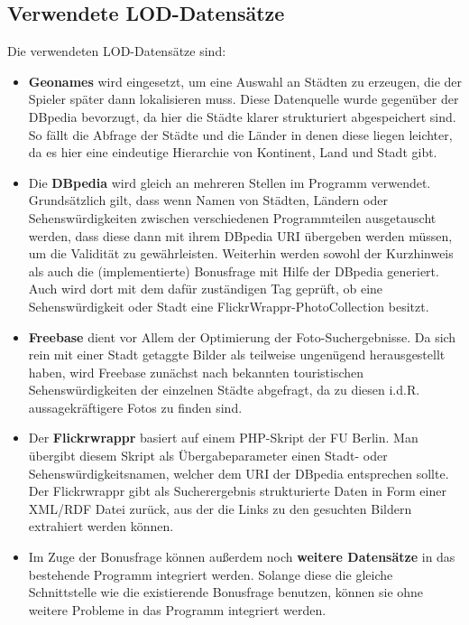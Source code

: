 \documentclass[a4paper, 11pt]{article}
\begin{document}
\subsection{Verwendete LOD-Datensätze}
Die verwendeten LOD-Datensätze sind:
\begin{itemize}
\item \textbf{Geonames} wird eingesetzt, um eine Auswahl an Städten zu erzeugen, die der Spieler später dann lokalisieren muss. Diese Datenquelle wurde gegenüber der DBpedia bevorzugt, da hier die Städte klarer strukturiert abgespeichert sind. So fällt die Abfrage der Städte und die Länder in denen diese liegen leichter, da es hier eine eindeutige Hierarchie von Kontinent, Land und Stadt gibt. 
\item Die \textbf{DBpedia} wird gleich an mehreren Stellen im Programm verwendet. Grundsätzlich gilt, dass wenn Namen von Städten, Ländern oder Sehenswürdigkeiten zwischen verschiedenen Programmteilen ausgetauscht werden, dass diese dann mit ihrem DBpedia URI übergeben werden müssen, um die Validität zu gewährleisten. Weiterhin werden sowohl der Kurzhinweis als auch die (implementierte) Bonusfrage mit Hilfe der DBpedia generiert. Auch wird dort mit dem dafür zuständigen Tag geprüft, ob eine Sehenswürdigkeit oder Stadt eine FlickrWrappr-PhotoCollection besitzt.
\item \textbf{Freebase} dient vor Allem der Optimierung der Foto-Suchergebnisse. Da sich rein mit einer Stadt getaggte Bilder als teilweise ungenügend herausgestellt haben, wird Freebase zunächst nach bekannten touristischen Sehenswürdigkeiten der einzelnen Städte abgefragt, da zu diesen i.d.R. aussagekräftigere Fotos zu finden sind.
\item Der \textbf{Flickrwrappr} basiert auf einem PHP-Skript der FU Berlin. Man übergibt diesem Skript als Übergabeparameter einen Stadt- oder Sehenswürdigkeitsnamen, welcher dem URI der DBpedia entsprechen sollte. Der Flickrwrappr gibt als Sucherergebnis strukturierte Daten in Form einer XML/RDF Datei zurück, aus der die Links zu den gesuchten Bildern extrahiert werden können.
\item Im Zuge der Bonusfrage können außerdem noch \textbf{weitere Datensätze} in das bestehende Programm integriert werden. Solange diese die gleiche Schnittstelle wie die existierende Bonusfrage benutzen, können sie ohne weitere Probleme in das Programm integriert werden.
\end{itemize}
\end{document}
